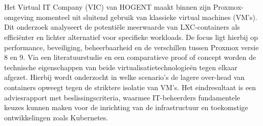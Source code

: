 
%
%
%
%
%

%



\chapter*{}

Het Virtual IT Company (VIC) van HOGENT maakt binnen zijn Proxmox-omgeving momenteel uit sluitend gebruik van klassieke virtual machines (VM’s). Dit onderzoek analyseert de potentiële meerwaarde van LXC-containers als efficiënter en lichter alternatief voor specifieke workloads. De focus ligt hierbij op performance, beveiliging, beheerbaarheid en de verschillen tussen Proxmox versie 8 en 9. Via een literatuurstudie en een comparatieve proof of concept worden de technische eigenschappen van beide virtualisatietechnologieën tegen elkaar afgezet. Hierbij wordt onderzocht in welke scenario’s de lagere over-head van containers opweegt tegen de striktere isolatie van VM’s. Het eindresultaat is een adviesrapport met beslissingscriteria, waarmee IT-beheerders fundamentele keuzes kunnen maken voor de inrichting van de infrastructuur en toekomstige ontwikkelingen zoals Kubernetes.

